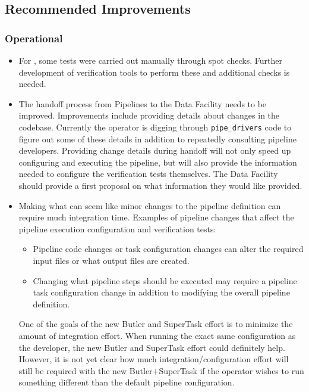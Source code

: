 \documentclass[DM,lsstdraft,STR,toc]{lsstdoc}
\begin{document}
\subsection{Recommended Improvements}
\label{sect:recommendations}

\subsubsection{Operational}

\begin{itemize}

  \item{
    For \milestoneId{}, some tests were carried out manually through spot checks.
    Further development of verification tools to perform these and additional checks is needed.
  }

  \item{
    The handoff process from Pipelines to the Data Facility needs to be improved.
    Improvements include providing details about changes in the codebase.
    Currently the operator is digging through \texttt{pipe{\_}drivers} code to figure out some of these details in addition to repeatedly consulting pipeline developers.
    Providing change details during handoff will not only speed up configuring and executing the pipeline, but will also provide the information needed to configure the verification tests themselves.
    The Data Facility should provide a first proposal on what information they would like provided.
  }

  \item{
    Making what can seem like minor changes to the pipeline definition can require much integration time.
    Examples of pipeline changes that affect the pipeline execution configuration and verification tests:

    \begin{itemize}

      \item{Pipeline code changes or task configuration changes can alter the required input files or what output files are created.}
      \item{Changing what pipeline steps should be executed may require a pipeline task configuration change in addition to modifying the overall pipeline definition.}

    \end{itemize}

    One of the goals of the new Butler and SuperTask effort is to minimize the amount of integration effort.
    When running the exact same configuration as the developer, the new Butler and SuperTask effort could definitely help.
    However, it is not yet clear how much integration/configuration effort will still be required with the new Butler+SuperTask if the operator wishes to run something different than the default pipeline configuration.
  }


\end{itemize}
\end{document}
